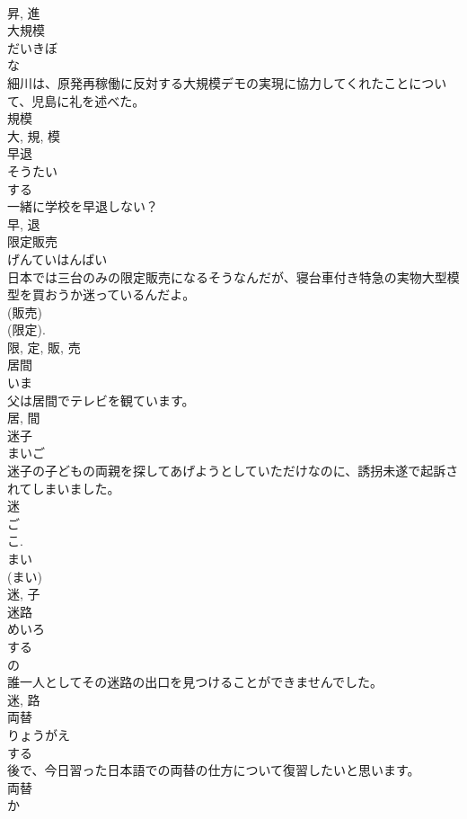 \documentclass[8pt]{extreport}
\begin{document}
\begin{CJK}{UTF8}{min}
\\	昇, 進	
\\	大規模	
\\	だいきぼ	
\\	な 
\\	細川は、原発再稼働に反対する大規模デモの実現に協力してくれたことについて、児島に礼を述べた。	
\\	規模 
\\	大, 規, 模	
\\	早退	
\\	そうたい	
\\	する 
\\	一緒に学校を早退しない？	
\\	早, 退	
\\	限定販売	
\\	げんていはんばい	
\\	日本では三台のみの限定販売になるそうなんだが、寝台車付き特急の実物大型模型を買おうか迷っているんだよ。	
\\	(販売) 
\\	(限定). 
\\	限, 定, 販, 売	
\\	居間	
\\	いま	
\\	父は居間でテレビを観ています。	
\\	居, 間	
\\	迷子	
\\	まいご	
\\	迷子の子どもの両親を探してあげようとしていただけなのに、誘拐未遂で起訴されてしまいました。	
\\	迷 
\\	ご 
\\	こ. 
\\	まい 
\\	(まい) 
\\	迷, 子	
\\	迷路	
\\	めいろ	
\\	する 
\\	の 
\\	誰一人としてその迷路の出口を見つけることができませんでした。	
\\	迷, 路	
\\	両替	
\\	りょうがえ	
\\	する 
\\	後で、今日習った日本語での両替の仕方について復習したいと思います。	
\\	両替 
\\	か 

\end{CJK}
\end{document}
